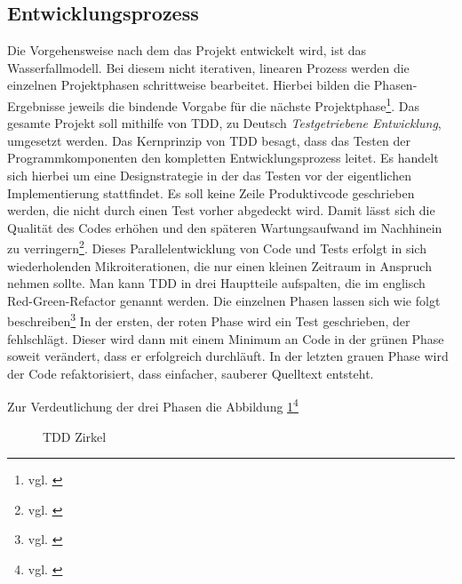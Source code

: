 \subsection{Entwicklungsprozess}
\label{sec:Entwicklungsprozess}
Die Vorgehensweise nach dem das Projekt entwickelt wird, ist das Wasserfallmodell.
Bei diesem nicht iterativen, linearen Prozess werden die einzelnen Projektphasen schrittweise bearbeitet. Hierbei bilden die Phasen-Ergebnisse jeweils die bindende Vorgabe für die nächste Projektphase\footnote{vgl. \cite[S. 263]{ItHandbuch}}.
Das gesamte Projekt soll mithilfe von \ac{TDD}, zu Deutsch \textit{Testgetriebene Entwicklung}, umgesetzt werden. Das Kernprinzip von \ac{TDD} besagt, dass das Testen der Programmkomponenten den kompletten Entwicklungsprozess leitet.
Es handelt sich hierbei um eine Designstrategie in der das Testen vor der eigentlichen Implementierung stattfindet. Es soll keine Zeile Produktivcode geschrieben werden, die nicht durch einen Test vorher abgedeckt wird.
Damit lässt sich die Qualität des Codes erhöhen und den späteren Wartungsaufwand im Nachhinein zu verringern\footnote{vgl. \cite{datenschutzbeauftragter}}.
Dieses Parallelentwicklung von Code und Tests erfolgt in sich wiederholenden Mikroiterationen, die nur einen kleinen Zeitraum in Anspruch nehmen sollte. Man kann \acs{TDD} in drei Hauptteile aufspalten, die im englisch Red-Green-Refactor genannt werden. 
Die einzelnen Phasen lassen sich wie folgt beschreiben\footnote{vgl. \cite{tddwiki}}
In der ersten, der roten Phase wird ein Test geschrieben, der fehlschlägt. Dieser wird dann mit einem Minimum an Code in der grünen Phase soweit verändert, dass er erfolgreich durchläuft. In der letzten grauen Phase wird der Code refaktorisiert, dass einfacher, sauberer Quelltext entsteht. 

Zur Verdeutlichung der drei Phasen die Abbildung \ref{fig:tddcircle}\footnote{vgl. \cite{tddcircle}}
\begin{figure}[htb]
\centering
{}
\caption{TDD Zirkel}
\label{fig:tddcircle}%
\end{figure}